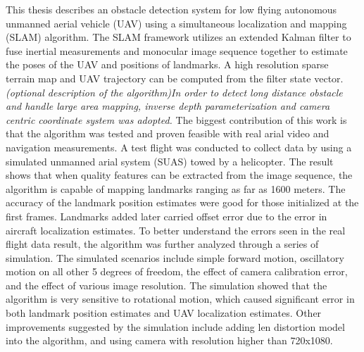 This thesis describes an obstacle detection system for low flying
autonomous unmanned aerial vehicle (UAV) using a simultaneous
localization and mapping (SLAM) algorithm.
The SLAM framework utilizes an extended Kalman filter to fuse inertial
measurements and monocular image sequence together to estimate the
poses of the UAV and positions of landmarks. A high resolution sparse
terrain map and UAV trajectory can be computed from the filter state
vector. 
\emph{(optional description of the algorithm)In order to
detect long distance obstacle and handle large area mapping, inverse
depth parameterization and camera centric coordinate system was
adopted.}
The biggest contribution of this work is that the algorithm was tested
and proven feasible with real arial video and navigation measurements.
A test flight was conducted to collect data by using a simulated
unmanned arial system (SUAS) towed by a helicopter. The result shows
that when quality features can be extracted from the image sequence,
the algorithm is capable of mapping landmarks ranging as far as 1600
meters. The accuracy of the landmark position estimates were good for
those initialized at the first frames. Landmarks added later carried
offset error due to the error in aircraft localization estimates.
To better understand the errors seen in the real flight data result,
the algorithm was further analyzed through a series of simulation. The
simulated scenarios include simple forward motion, oscillatory motion
on all other 5 degrees of freedom, the effect of camera calibration
error, and the effect of various image resolution. The simulation
showed that the algorithm is very sensitive to rotational motion,
which caused significant error in both landmark position estimates and
UAV localization estimates. Other improvements suggested by the
simulation include adding len distortion model into the algorithm, and
using camera with resolution higher than 720x1080.
